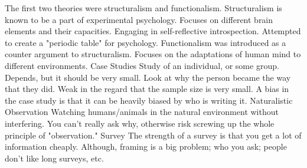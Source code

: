{}\markdownRendererUlBeginTight
\markdownRendererUlItem The first two theories were structuralism and functionalism.\markdownRendererUlItemEnd 
\markdownRendererUlItem Structuralism is known to be a part of experimental psychology.\markdownRendererInterblockSeparator
{}\markdownRendererUlBeginTight
\markdownRendererUlItem Focuses on different brain elements and their capacities.\markdownRendererUlItemEnd 
\markdownRendererUlItem Engaging in self-reflective introspection.\markdownRendererUlItemEnd 
\markdownRendererUlItem Attempted to create a "periodic table" for psychology.\markdownRendererUlItemEnd 
\markdownRendererUlEndTight \markdownRendererUlItemEnd 
\markdownRendererUlItem Functionalism was introduced as a counter argument to structuralism.\markdownRendererInterblockSeparator
{}\markdownRendererUlBeginTight
\markdownRendererUlItem Focuses on the adaptations of human mind to different environments.\markdownRendererUlItemEnd 
\markdownRendererUlEndTight \markdownRendererUlItemEnd 
\markdownRendererUlEndTight \markdownRendererInterblockSeparator
{}\markdownRendererInterblockSeparator
{}\markdownRendererUlBeginTight
\markdownRendererUlItem Case Studies\markdownRendererInterblockSeparator
{}\markdownRendererUlBeginTight
\markdownRendererUlItem Study of an individual, or some group. Depends, but it should be very small.\markdownRendererUlItemEnd 
\markdownRendererUlItem Look at why the person became the way that they did.\markdownRendererUlItemEnd 
\markdownRendererUlItem Weak in the regard that the sample size is very small.\markdownRendererUlItemEnd 
\markdownRendererUlItem A bias in the case study is that it can be heavily biased by who is writing it.\markdownRendererUlItemEnd 
\markdownRendererUlEndTight \markdownRendererUlItemEnd 
\markdownRendererUlItem Naturalistic Observation\markdownRendererInterblockSeparator
{}\markdownRendererUlBeginTight
\markdownRendererUlItem Watching humans/animals in the natural environment without interfering.\markdownRendererUlItemEnd 
\markdownRendererUlItem You can't really ask why, otherwise risk screwing up the whole principle of "observation."\markdownRendererUlItemEnd 
\markdownRendererUlEndTight \markdownRendererUlItemEnd 
\markdownRendererUlItem Survey\markdownRendererInterblockSeparator
{}\markdownRendererUlBeginTight
\markdownRendererUlItem The strength of a survey is that you get a lot of information cheaply. Although, framing is a big problem; who you ask; people don't like long surveys, etc.\markdownRendererUlItemEnd 
\markdownRendererUlEndTight \markdownRendererUlItemEnd 
